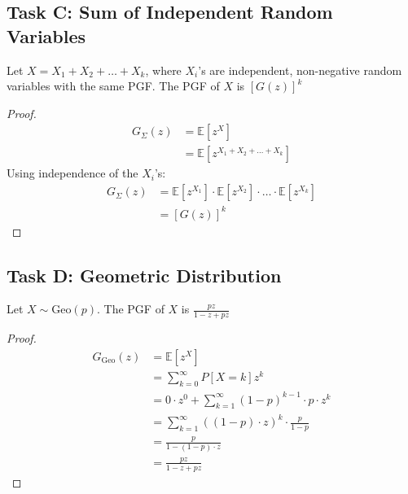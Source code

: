 \subsection*{Task C: Sum of Independent Random Variables}
\begin{claim}
	Let \(X = X_1 + X_2 + \dots + X_k\), where \(X_i\)'s are independent, non-negative random variables with the same PGF. The PGF of \(X\) is \([G(z)]^k\)
\end{claim}
\begin{proof}
	\begin{align*}
		G_{\Sigma}(z) & = \mathbb{E}[z^X]                         \\
		              & = \mathbb{E}[z^{X_1 + X_2 + \dots + X_k}]
	\end{align*}
	Using independence of the \(X_i\)'s:
	\begin{align*}
		G_{\Sigma}(z) & = \mathbb{E}[z^{X_1}] \cdot \mathbb{E}[z^{X_2}] \cdot \dots \cdot \mathbb{E}[z^{X_k}] \\
		              & = [G(z)]^k
	\end{align*}
\end{proof}

\subsection*{Task D: Geometric Distribution}
\begin{claim}
	Let \(X \sim \text{Geo}(p)\). The PGF of \(X\) is \(\frac{pz}{1 - z + pz}\)
\end{claim}
\begin{proof}
	\begin{align*}
		G_{\textrm{Geo}}(z) & = \mathbb{E}[z^X]                                               \\
		                    & = \sum_{k=0}^\infty P[X = k]z^k                                 \\
		                    & = 0 \cdot z^0 + \sum_{k=1}^\infty (1-p)^{k-1} \cdot p \cdot z^k \\
		                    & = \sum_{k=1}^\infty ((1-p) \cdot z)^k \cdot \frac{p}{1-p}       \\
		                    & = \frac{p}{1 - (1-p) \cdot z}                                   \\
		                    & = \frac{pz}{1 - z + pz}
	\end{align*}
\end{proof}

